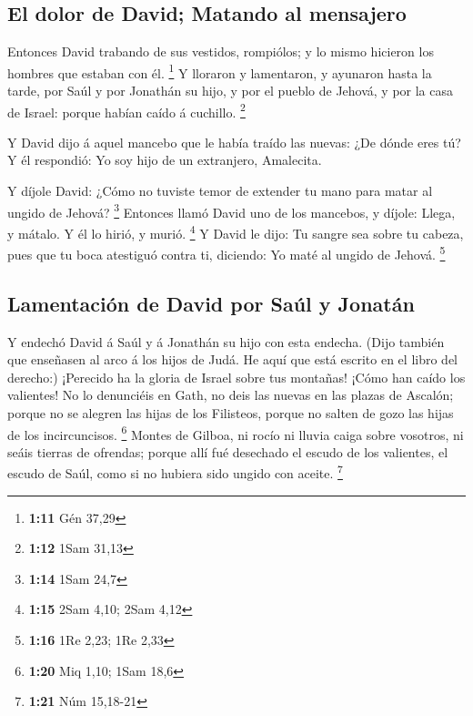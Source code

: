 \hypertarget{el-dolor-de-david-matando-al-mensajero}{%
\subsection{El dolor de David; Matando al
mensajero}\label{el-dolor-de-david-matando-al-mensajero}}

 Entonces David trabando de sus vestidos, rompiólos; y lo
mismo hicieron los hombres que estaban con él. \footnote{\textbf{1:11}
  Gén 37,29}  Y lloraron y lamentaron, y ayunaron hasta la
tarde, por Saúl y por Jonathán su hijo, y por el pueblo de Jehová, y por
la casa de Israel: porque habían caído á cuchillo. \footnote{\textbf{1:12}
  1Sam 31,13}

 Y David dijo á aquel mancebo que le había traído las
nuevas: ¿De dónde eres tú? Y él respondió: Yo soy hijo de un extranjero,
Amalecita.

 Y díjole David: ¿Cómo no tuviste temor de extender tu mano
para matar al ungido de Jehová? \footnote{\textbf{1:14} 1Sam 24,7}
 Entonces llamó David uno de los mancebos, y díjole: Llega,
y mátalo. Y él lo hirió, y murió. \footnote{\textbf{1:15} 2Sam 4,10;
  2Sam 4,12}  Y David le dijo: Tu sangre sea sobre tu
cabeza, pues que tu boca atestiguó contra ti, diciendo: Yo maté al
ungido de Jehová. \footnote{\textbf{1:16} 1Re 2,23; 1Re 2,33}

\hypertarget{lamentaciuxf3n-de-david-por-sauxfal-y-jonatuxe1n}{%
\subsection{Lamentación de David por Saúl y
Jonatán}\label{lamentaciuxf3n-de-david-por-sauxfal-y-jonatuxe1n}}

 Y endechó David á Saúl y á Jonathán su hijo con esta
endecha.  (Dijo también que enseñasen al arco á los hijos
de Judá. He aquí que está escrito en el libro del derecho:)
 ¡Perecido ha la gloria de Israel sobre tus montañas! ¡Cómo
han caído los valientes!  No lo denunciéis en Gath, no deis
las nuevas en las plazas de Ascalón; porque no se alegren las hijas de
los Filisteos, porque no salten de gozo las hijas de los incircuncisos.
\footnote{\textbf{1:20} Miq 1,10; 1Sam 18,6}  Montes de
Gilboa, ni rocío ni lluvia caiga sobre vosotros, ni seáis tierras de
ofrendas; porque allí fué desechado el escudo de los valientes, el
escudo de Saúl, como si no hubiera sido ungido con aceite. \footnote{\textbf{1:21}
  Núm 15,18-21}

